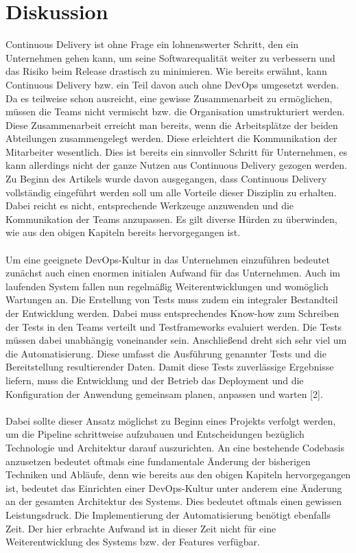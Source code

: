 \section{Diskussion}
Continuous Delivery ist ohne Frage ein lohnenswerter Schritt, den ein Unternehmen gehen kann, um seine Softwarequalität weiter zu verbessern und das Risiko beim Release drastisch zu minimieren. Wie bereits erwähnt, kann Continuous Delivery bzw. ein Teil davon auch ohne DevOps umgesetzt werden. Da es teilweise schon ausreicht, eine gewisse Zusammenarbeit zu ermöglichen, müssen die Teams nicht vermischt bzw. die Organisation umstrukturiert werden. Diese Zusammenarbeit erreicht man bereits, wenn die Arbeitsplätze der beiden Abteilungen zusammengelegt werden. Diese erleichtert die Kommunikation der Mitarbeiter wesentlich. Dies ist bereits ein sinnvoller Schritt für Unternehmen, es kann allerdings nicht der ganze Nutzen aus Continuous Delivery gezogen werden. Zu Beginn des Artikels wurde davon ausgegangen, dass Continuous Delivery vollständig eingeführt werden soll um alle Vorteile dieser Disziplin zu erhalten. Dabei reicht es nicht, entsprechende Werkzeuge anzuwenden und die Kommunikation der Teams anzupassen. Es gilt diverse Hürden zu überwinden, wie aus den obigen Kapiteln bereits hervorgegangen ist. \\ \\
Um eine geeignete DevOps-Kultur in das Unternehmen einzuführen bedeutet zunächst auch einen enormen initialen Aufwand für das Unternehmen. Auch im laufenden System fallen nun regelmäßig Weiterentwicklungen und womöglich Wartungen an. Die Erstellung von Tests muss zudem ein integraler Bestandteil der Entwicklung werden. Dabei muss entsprechendes Know-how zum Schreiben der Tests in den Teams verteilt und Testframeworks evaluiert werden. Die Tests müssen dabei unabhängig voneinander sein. Anschließend dreht sich sehr viel um die Automatisierung. Diese umfasst die Ausführung genannter Tests und die Bereitstellung resultierender Daten. Damit diese Tests zuverlässige Ergebnisse liefern, muss die Entwicklung und der Betrieb das Deployment und die Konfiguration der Anwendung gemeinsam planen, anpassen und warten [2].\\ \\
Dabei sollte dieser Ansatz möglichst zu Beginn eines Projekts verfolgt werden, um die Pipeline schrittweise aufzubauen und Entscheidungen bezüglich Technologie und Architektur darauf auszurichten. An eine bestehende Codebasis anzusetzen bedeutet oftmals eine fundamentale Änderung der bisherigen Techniken und Abläufe, denn wie bereits aus den obigen Kapiteln hervorgegangen ist, bedeutet das Einrichten einer DevOps-Kultur unter anderem eine Änderung an der gesamten Architektur des Systems. Dies bedeutet oftmals einen gewissen Leistungsdruck. Die Implementierung der Automatisierung benötigt ebenfalls Zeit. Der hier erbrachte Aufwand ist in dieser Zeit nicht für eine Weiterentwicklung des Systems bzw. der Features verfügbar.\\ \\

